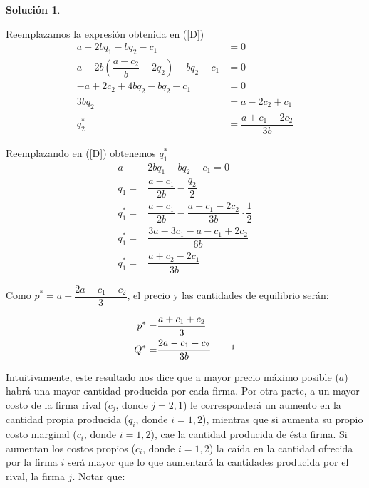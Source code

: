 \documentclass[a4paper, 11pt]{article}
\theoremstyle{definition}
\newtheorem{solucion}{Soluci\'on}
\begin{document}
\begin{solucion}
\begin{enumerate}[label=(\alph*)]
Reemplazamos la expresión obtenida en  (\ref{D})
\vspace*{-12pt}
\begin{align*}
a-2bq_1-bq_2-c_1&=0\\
a-2b\left(\dfrac{a-c_2}{b}-2q_2 \right)-bq_2-c_1&=0\\
-a+2c_2+4bq_2-bq_2-c_1&=0\\
3bq_2&=a-2c_2+c_1\\
q_2^*&=\dfrac{a+c_1-2c_2}{3b}
\end{align*}

\vspace*{-12pt}

Reemplazando en (\ref{D}) obtenemos $q_1^*$
\vspace*{-12pt}
\begin{align*}
a-&2bq_1-bq_2-c_1=0\\
q_1=&\dfrac{a-c_1}{2b}-\dfrac{q_2}{2}\\
q_1^*=&\dfrac{a-c_1}{2b}-\dfrac{a+c_1-2c_2}{3b}\cdot\dfrac{1}{2}\\
q_1^*=&\dfrac{3a-3c_1-a-c_1+2c_2}{6b}\\
q_1^*=&\dfrac{a+c_2-2c_1}{3b}
 \end{align*}
 
 Como $p^*=a-\dfrac{2a-c_1-c_2}{3}$, el precio y las cantidades de equilibrio serán:
 
 \vspace*{-12pt}
 
 \begin{align*}
p^*=&\dfrac{a+c_1+c_2}{3}\\
Q^*=&\dfrac{2a-c_1-c_2}{3b} \qquad \footnotemark
 \end{align*}
 
Intuitivamente, este resultado nos dice que a mayor precio máximo posible ($a$) habrá una mayor cantidad producida por cada firma. Por otra parte, a un mayor costo de la firma rival ($c_j, \, \text{donde } j=2,1$) le corresponderá un aumento en la cantidad propia producida ($q_i, \, \text{donde }i=1,2$), mientras que si aumenta su propio costo marginal ($c_i, \, \text{donde }i=1,2$), cae la cantidad producida de ésta firma. Si aumentan los costos propios ($c_i, \,\text{donde }i=1,2$) la caída en la cantidad ofrecida por la firma $i$ será mayor que lo que aumentará la cantidades producida por el rival, la firma $j$. Notar que:


\end{enumerate}
\end{solucion}
\end{document}
